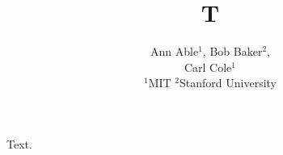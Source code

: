 \documentclass{fairmeta}
\title{T}
\author{Ann Able$^{1}$, Bob Baker$^{2}$,\\ Carl Cole$^{1}$
\\[1em] $^1$MIT \quad $^2$Stanford University}
\begin{document}
\maketitle
Text.
\end{document}
